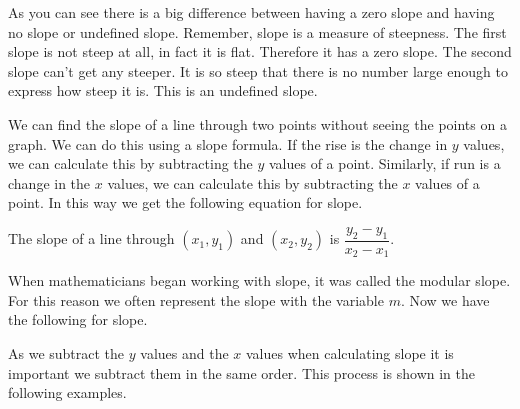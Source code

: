 \documentclass[12pt]{book}
\theoremstyle{definition}
\begin{document}
As you can see there is a big difference between having a zero slope and having no slope or undefined slope. Remember, slope is a measure of steepness. The first slope is not steep at all, in fact it is flat. Therefore it has a zero slope. The second slope can't get any steeper. It is so steep that there is no number large enough to express how steep it is. This is an undefined slope.\par
We can find the slope of a line through two points without seeing the points on a graph. We can do this using a slope formula. If the rise is the change in $y$ values, we can calculate this by subtracting the $y$ values of a point. Similarly, if run is a change in the $x$ values, we can calculate this by subtracting the $x$ values of a point. In this way we get the following equation for slope.
\begin{center}
The slope of a line through $(x_1,y_1)$ and $(x_2,y_2)$ is $\dfrac{y_2 - y_1}{x_2 - x_1}$.
\end{center}
When mathematicians began working with slope, it was called the modular slope. For this reason we often represent the slope with the variable $m$. Now we have the following for slope.
\begin{center}
\end{center}
As we subtract the $y$ values and the $x$ values when calculating slope it is important we subtract them in the same order. This process is shown in the following examples.
\end{document}

